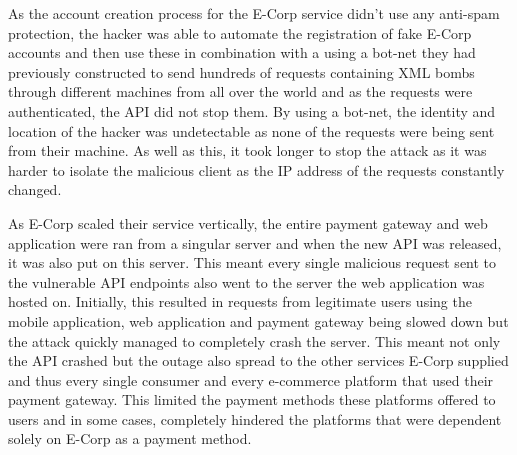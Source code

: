 \documentclass[]{report}
\begin{document}
As the account creation process for the E-Corp service didn't use any anti-spam protection, the hacker was able to automate the registration of fake E-Corp accounts and then use these in combination with a using a bot-net they had previously constructed to send hundreds of requests containing XML bombs through different machines from all over the world and as the requests were authenticated, the API did not stop them. By using a bot-net, the identity and location of the hacker was undetectable as none of the requests were being sent from their machine. As well as this, it took longer to stop the attack as it was harder to isolate the malicious client as the IP address of the requests constantly changed. 

As E-Corp scaled their service vertically, the entire payment gateway and web application were ran from a singular server and when the new API was released, it was also put on this server. This meant every single malicious request sent to the vulnerable API endpoints also went to the server the web application was hosted on. Initially, this resulted in requests from legitimate users using the mobile application, web application and payment gateway being slowed down but the attack quickly managed to completely crash the server. This meant not only the API crashed but the outage also spread to the other services E-Corp supplied and thus every single consumer and every e-commerce platform that used their payment gateway. This limited the payment methods these platforms offered to users and in some cases, completely hindered the platforms that were dependent solely on E-Corp as a payment method.
	
\end{document}
